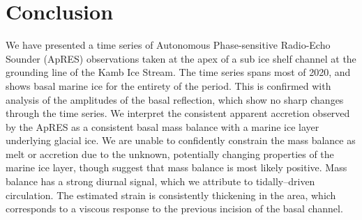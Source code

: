 \section{Conclusion}

We have presented a time series of Autonomous Phase-sensitive Radio-Echo Sounder (ApRES) observations taken at the apex of a sub ice shelf channel at the grounding line of the Kamb Ice Stream. The time series spans most of 2020, and shows basal marine ice for the entirety of the period. This is confirmed with analysis of the amplitudes of the basal reflection, which show no sharp changes through the time series. We interpret the consistent apparent accretion observed by the ApRES as a consistent basal mass balance with a marine ice layer underlying glacial ice.  We are unable to confidently constrain the mass balance as melt or accretion due to the unknown, potentially changing properties of the marine ice layer, though suggest that mass balance is most likely positive.  Mass balance has a strong diurnal signal, which we attribute to tidally--driven circulation. The estimated strain is consistently thickening in the area, which corresponds to a viscous response to the previous incision of the basal channel.


